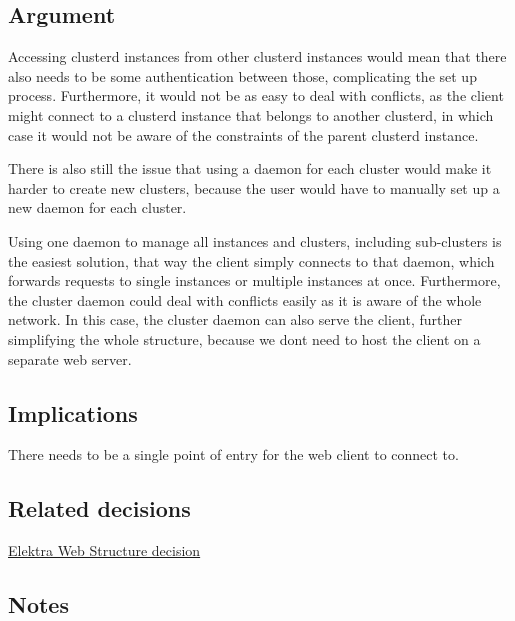 \subsection*{Argument}

Accessing clusterd instances from other clusterd instances would mean that there also needs to be some authentication between those, complicating the set up process. Furthermore, it would not be as easy to deal with conflicts, as the client might connect to a clusterd instance that belongs to another clusterd, in which case it would not be aware of the constraints of the parent clusterd instance.

There is also still the issue that using a daemon for each cluster would make it harder to create new clusters, because the user would have to manually set up a new daemon for each cluster.

Using one daemon to manage all instances and clusters, including sub-\/clusters is the easiest solution, that way the client simply connects to that daemon, which forwards requests to single instances or multiple instances at once. Furthermore, the cluster daemon could deal with conflicts easily as it is aware of the whole network. In this case, the cluster daemon can also serve the client, further simplifying the whole structure, because we don\textquotesingle{}t need to host the client on a separate web server.

\subsection*{Implications}


\begin{DoxyItemize}
\item There needs to be a single point of entry for the web client to connect to.
\end{DoxyItemize}

\subsection*{Related decisions}


\begin{DoxyItemize}
\item \hyperlink{doc_decisions_elektra_web_md}{Elektra Web Structure decision}
\end{DoxyItemize}

\subsection*{Notes}